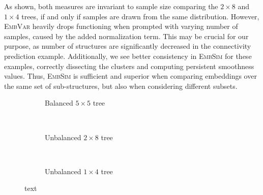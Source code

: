 \documentclass[]{article}
\begin{document}
As shown, both measures are invariant to sample size comparing the $2\times 8$ and $1\times 4$ trees, if and only if samples are drawn from the same distribution. However, \textsc{EmbVar} heavily drops functioning when prompted with varying number of samples, caused by the added normalization term. This may be crucial for our purpose, as number of structures are significantly decreased in the connectivity prediction example. Additionally, we see better consistency in \textsc{EmbSim} for these examples, correctly dissecting the clusters and computing persistent smoothness values. Thus, \textsc{EmbSim} is sufficient and superior when comparing embeddings over the same set of sub-structures, but also when considering different subsets.\\

\begin{figure}
	\centering
	\begin{subfigure}{1.\textwidth}
		\centering
		\caption{Balanced $5\times 5$ tree}
		\label{fig:tree_balanced}
	\end{subfigure}\\
	
	\begin{subfigure}{1.\textwidth}
		\centering
		\label{fig:tree_unbalanced}
		\caption{Unbalanced $2\times 8$ tree}
	\end{subfigure}	\\
	\begin{subfigure}{1.\textwidth}
		\centering
		\label{fig:tree_unbalanced_reduced}
		\caption{Unbalanced $1\times 4$ tree}
	\end{subfigure}	
	\label{fig:trees}
	\caption{text}
\end{figure}
\end{document}
